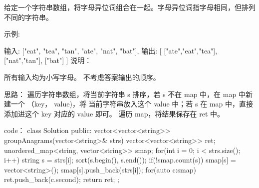 给定一个字符串数组，将字母异位词组合在一起。字母异位词指字母相同，但排列不同的字符串。

示例:

输入: ["eat", "tea", "tan", "ate", "nat", "bat"],
输出:
[
  ["ate","eat","tea"],
  ["nat","tan"],
  ["bat"]
]
说明：

所有输入均为小写字母。
不考虑答案输出的顺序。





























思路：
遍历字符串数组，将当前字符串 s 排序，若 s 不在 map 中，在 map 中新建一个 （key， value)，将 当前字符串放入这个 value 中；若 s 在 map 中，直接添加进这个 key 对应的 value 即可。
遍历 map，将结果保存在 ret 中。






















code：
class Solution {
public:
    vector<vector<string>> groupAnagrams(vector<string>& strs) {
        vector<vector<string>> ret;
        unordered_map<string, vector<string>> smap;
        for(int i = 0; i < strs.size(); i++)
        {
            string s = strs[i];
            sort(s.begin(), s.end());
            if(!smap.count(s)) smap[s] = vector<string>();
            smap[s].push_back(strs[i]);
        }
        for(auto c:smap) ret.push_back(c.second);
        return ret;
    }
};
